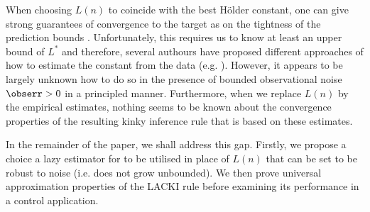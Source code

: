 

When choosing $L(n)$ to coincide with the best H\"older constant, one can give strong guarantees of convergence to the target as on the tightness of the prediction bounds  \cite{calliess2014_thesis}. 
Unfortunately, this requires us to know at least an upper bound of $L^*$ and therefore, several authours have proposed different approaches of how to estimate the constant from the data (e.g. \cite{Strongin1973,Wood1996}). However, it appears to be largely unknown how to do so in the presence of bounded observational noise $\obserr >0$ in a principled manner. Furthermore, when we replace $L(n)$ by the empirical estimates, nothing seems to be known about the convergence properties of the resulting kinky inference rule that is based on these estimates.  

In the remainder of the paper, we shall address this gap. Firstly, we propose a choice a lazy estimator for to be utilised in place of $L(n)$ that can be set to be robust to noise (i.e. does not grow unbounded). We then prove universal approximation properties of the LACKI rule before examining its performance in a control application.

